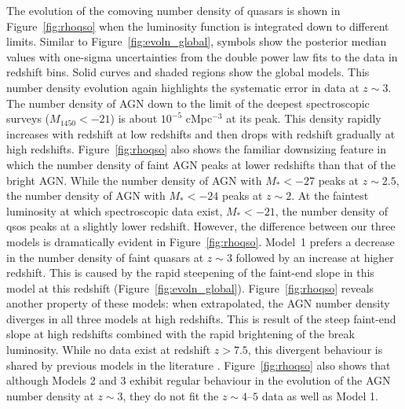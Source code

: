 \documentclass[fleqn,usenatbib]{mnras}
\begin{document}
The evolution of the comoving number density of quasars is shown in
Figure~\ref{fig:rhoqso} when the luminosity function is integrated
down to different limits.  Similar to Figure~\ref{fig:evoln_global},
symbols show the posterior median values with one-sigma uncertainties
from the double power law fits to the data in redshift bins.
Solid curves and shaded regions show the global models.  This number
density evolution again highlights the systematic error in data at
$z\sim 3$.  The number density of AGN down to the limit of the deepest
spectroscopic surveys ($M_{1450}<-21$) is about $10^{-5}$ cMpc$^{-3}$
at its peak.  This density rapidly increases with redshift at low
redshifts and then drops with redshift gradually at high redshifts.
Figure~\ref{fig:rhoqso} also shows the familiar downsizing feature in
which the number density of faint AGN peaks at lower redshifts than
that of the bright AGN.  While the number density of AGN with
$M_*<-27$ peaks at $z\sim 2.5$, the number density of AGN with
$M_*<-24$ peaks at $z\sim 2$.  At the faintest luminosity at which
spectroscopic data exist, $M_*<-21$, the number density of qsos peaks
at a slightly lower redshift.  However, the difference between our
three models is dramatically evident in Figure~\ref{fig:rhoqso}.
Model~1 prefers a decrease in the number density of faint quasars at
$z\sim 3$ followed by an increase at higher redshift.  This is caused
by the rapid steepening of the faint-end slope in this model at this
redshift (Figure~\ref{fig:evoln_global}).  Figure~\ref{fig:rhoqso}
reveals another property of these models: when extrapolated, the AGN
number density diverges in all three models at high redshifts.
This is result of the steep faint-end slope at high
redshifts combined with the rapid brightening of the break luminosity.
While no data exist at redshift $z>7.5$, this divergent behaviour is
shared by previous models in the literature
\citep{2007ApJ...654..731H}.  Figure~\ref{fig:rhoqso} also shows that
although Models 2 and 3 exhibit regular behaviour in the evolution of
the AGN number density at $z\sim 3$, they do not fit the $z\sim
4$--$5$ data as well as Model 1.
\end{document}
